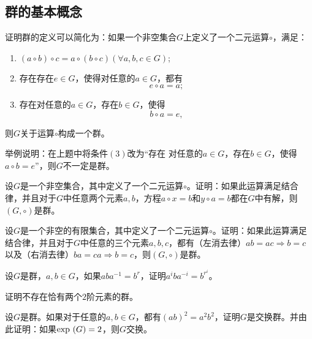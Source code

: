 \subsection{群的基本概念}
\begin{prob}
 证明群的定义可以简化为：如果一个非空集合$G$上定义了一个二元运算$\circ $，满足：
\begin{enumerate}[$(1)$]
\item {}$\left(a\circ b\right)\circ c=a\circ \left(b\circ c\right)\left(\forall a,b,c\in G\right)$;
\item 存在{}存在$e\in G$，使得对任意的$a\in G$，都有
\begin{equation*}
e\circ a=a;
\end{equation*}
\item 存在{}对任意的$a\in G$，存在$b\in G$，使得
\begin{equation*}
b\circ a=e,
\end{equation*}
\end{enumerate}
则$G$关于运算$\circ $构成一个群。
\end{prob}

\begin{prob}
举例说明：在上题中将条件$(3)$改为“存在{} 对任意的$a\in G$，存在$b\in G$，使得$a\circ b=e$”，则$G$不一定是群。
\end{prob}

\begin{prob}
设$G$是一个非空集合，其中定义了一个二元运算$\circ $。证明：如果此运算满足结合律，并且对于$G$中任意两个元素$a,b$，方程$a\circ x=b$和$y\circ a=b$都在$G$中有解，则$\left(G,\circ \right)$是群。
\end{prob}

\begin{prob}
设$G$是一个非空的有限集合，其中定义了一个二元运算$\circ $。证明：如果此运算满足结合律，并且对于$G$中任意的三个元素$a,b,c$，都有（左消去律）$ab=ac\Rightarrow b=c$以及（右消去律）$ba=ca\Rightarrow b=c$，则$\left(G,\circ \right)$是群。
\end{prob}

\begin{prob}
设$G$是群，$a,b\in G$，如果$aba^{-1}=b^{r}$，证明$a^{i}ba^{-i}=b^{r^{i}}$。
\end{prob}

\begin{prob}
证明不存在恰有两个$2$阶元素的群。
\end{prob}

\begin{prob}
设$G$是群。如果对于任意的$a,b\in G$，都有$\left(ab\right)^{2}=a^{2}b^{2}$，证明$G$是交换群。并由此证明：如果${\rm exp}\mathop{}\left(G\right)=2$，则$G$交换。
\end{prob}

